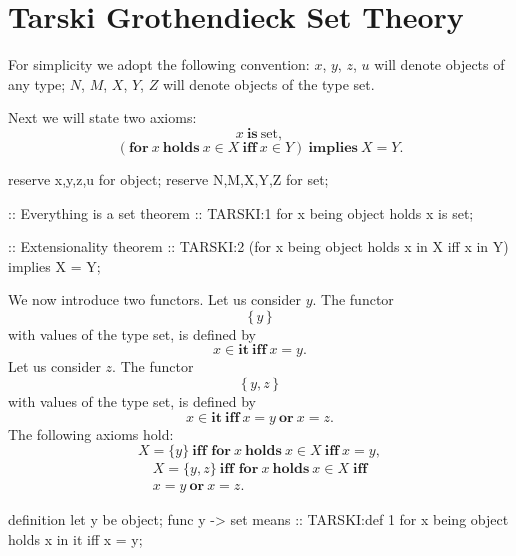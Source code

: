 \section{Tarski Grothendieck Set Theory}

\begin{paracol}{2}
For simplicity we adopt the following convention: $x$, $y$,
$z$, $u$ will denote objects of any type; $N$, $M$, $X$, $Y$, $Z$
will denote objects of the type set.
  
Next we will state two axioms:
\begin{equation}
x~\textbf{is}~\textrm{set},
\end{equation}
\begin{equation}
(\textbf{for}~x~\textbf{holds}~x\in X~\textbf{iff}~x\in Y)~\textbf{implies}~X=Y.
\end{equation}

\switchcolumn

\begin{mizar}
 reserve x,y,z,u for object;
 reserve N,M,X,Y,Z for set;

:: Everything is a set
theorem :: TARSKI:1
  for x being object holds x is set;

:: Extensionality
theorem :: TARSKI:2 
  (for x being object
   holds x in X iff x in Y)
  implies X = Y;
\end{mizar}

\switchcolumn*
\ensurevspace{5cm}

We now introduce two functors. Let us consider $y$. The functor
\[ \{\,y\,\} \]
with values of the type set, is defined by
\[ x\in\textbf{it}~\textbf{iff}~x=y.\]
Let us consider $z$. The functor
\[ \{\,y,z\,\} \]
with values of the type set, is defined by
\[ x\in\textbf{it}~\textbf{iff}~x=y~\textbf{or}~x=z.\]
The following axioms hold:
\begin{equation}
X=\{y\}~\textbf{iff\ for}~x~\textbf{holds}~x\in X~\textbf{iff}~x=y,
\end{equation}
\begin{multline}
X=\{y,z\}~\textbf{iff\ for}~x~\textbf{holds}~x\in X\;\textbf{iff}\\
x=y~\textbf{or}~x=z.
\end{multline}

\switchcolumn

\begin{mizar}
definition
  let y be object;
  func { y } -> set means
:: TARSKI:def 1
    for x being object
    holds x in it iff x = y;


\end{mizar}
\end{paracol}
